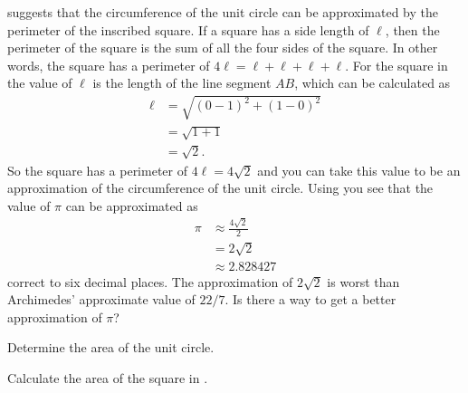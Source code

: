 \documentclass[a4paper,oneside,12pt]{article}
\begin{document}
 suggests that the circumference
of the unit circle can be approximated by the perimeter of the
inscribed square.  If a square has a side length of $\ell$, then the
perimeter of the square is the sum of all the four sides of the
square.  In other words, the square has a perimeter of
$4\ell = \ell + \ell + \ell + \ell$.  For the square in
 the value of $\ell$ is the length
of the line segment $AB$, which can be calculated as
\begin{align*}
\ell
&=
\sqrt{(0 - 1)^2 + (1 - 0)^2} \\[4pt]
&=
\sqrt{1 + 1} \\[4pt]
&=
\sqrt{2}.
\end{align*}
So the square has a perimeter of $4\ell = 4\sqrt{2}$ and you can take
this value to be an approximation of the circumference of the unit
circle.  Using  you see
that the value of $\pi$ can be approximated as
\begin{equation}
\label{eqn:approximate_pi_inscribed_square}
\begin{aligned}
\pi
&\approx
\frac{4\sqrt{2}}{2} \\[4pt]
&=
2\sqrt{2} \\[4pt]
&\approx
2.828427
\end{aligned}
\end{equation}
correct to six decimal places.  The approximation of $2\sqrt{2}$ is
worst than Archimedes' approximate value of $22/7$.  Is there a way to
get a better approximation of $\pi$?

\begin{exercise}
Determine the area of the unit circle.
\end{exercise}


\begin{exercise}
Calculate the area of the square in
.
\end{exercise}

\end{document}
